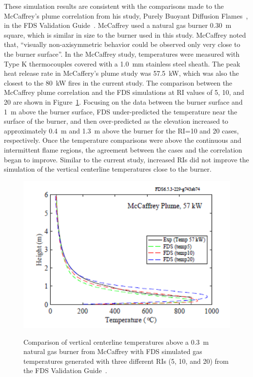 \documentclass[twoside]{uocthesis}
\begin{document}
{These simulation results are consistent with the comparisons made to the McCaffrey's plume correlation from his study, Purely Buoyant Diffusion Flames~\cite{McCaffrey:1979}, in the FDS Validation Guide~\cite{FDS_Validation_Guide}. McCaffrey used a natural gas burner 0.30~m square, which is similar in size to the burner used in this study.  McCaffrey noted that, ``visually non-axisymmetric behavior could be observed only very close to the burner surface''.  In the McCaffrey study, temperatures were measured with Type K thermocouples covered with a 1.0~mm stainless steel sheath. The peak heat release rate in McCaffery's plume study was 57.5~kW, which was also the closest to the 80~kW fires in the current study.  The comparison between the McCaffrey plume correlation and the FDS simulations at RI values of 5, 10, and 20 are shown in Figure~\ref{McCaffrey_Plume_comp}. Focusing on the data between the burner surface and 1~m above the burner surface, FDS under-predicted the temperature near the surface of the burner, and then over-predicted as the elevation increased to approximately 0.4~m and 1.3~m above the burner for the RI=10 and 20 cases, respectively. Once the temperature comparisons were above the continuous and intermittent flame regions, the agreement between the cases and the correlation began to improve.  Similar to the current study, increased RIs did not improve the simulation of the vertical centerline temperatures close to the burner.   

\begin{figure}[h]
	\includegraphics[width=5in] {../Figures/McCaffrey_Plume_comp}  \\
	\caption[Comparison of vertical centerline temperatures above a 0.3~m natural gas burner from McCaffrey with FDS simulated gas temperatures.] {Comparison of vertical centerline temperatures above a 0.3~m natural gas burner from McCaffrey with FDS simulated gas temperatures generated with three different RIs (5, 10, and 20) from the FDS Validation Guide~\cite{FDS_Validation_Guide}.}
	\label{McCaffrey_Plume_comp}
\end{figure}

}
\end{document}
